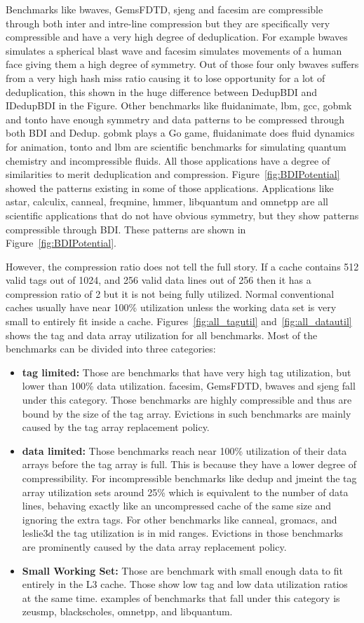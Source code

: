 Benchmarks like bwaves, GemsFDTD, sjeng and facesim are compressible through both inter and intre-line compression but they are specifically very compressible and have a very high degree of deduplication. For example bwaves simulates a spherical blast wave and facesim simulates movements of a human face giving them a high degree of symmetry. Out of those four only bwaves suffers from a very high hash miss ratio causing it to lose opportunity for a lot of deduplication, this shown in the huge difference between DedupBDI and IDedupBDI in the Figure. Other benchmarks like fluidanimate, lbm, gcc, gobmk and tonto have enough symmetry and data patterns to be compressed through both BDI and Dedup. gobmk plays a Go game, fluidanimate does fluid dynamics for animation, tonto and lbm are scientific benchmarks for simulating quantum chemistry and incompressible fluids. All those applications have a degree of similarities to merit deduplication and compression. Figure~\ref{fig:BDIPotential} showed the patterns existing in some of those applications. Applications like astar, calculix, canneal, freqmine, hmmer, libquantum and omnetpp are all scientific applications that do not have obvious symmetry, but they show patterns compressible through BDI. These patterns are shown in Figure~\ref{fig:BDIPotential}.\par
However, the compression ratio does not tell the full story. If a cache contains 512 valid tags out of 1024, and 256 valid data lines out of 256 then it has a compression ratio of 2 but it is not being fully utilized. Normal conventional caches usually have near 100\% utilization unless the working data set is very small to entirely fit inside a cache. Figures~\ref{fig:all_tagutil} and~\ref{fig:all_datautil} shows the tag and data array utilization for all benchmarks. Most of the benchmarks can be divided into three categories:
\begin{itemize}
    \item \textbf{tag limited:} Those are benchmarks that have very high tag utilization, but lower than 100\% data utilization. facesim, GemsFDTD, bwaves and sjeng fall under this category. Those benchmarks are highly compressible and thus are bound by the size of the tag array. Evictions in such benchmarks are mainly caused by the tag array replacement policy.
    \item \textbf{data limited:} Those benchmarks reach near 100\% utilization of their data arrays before the tag array is full. This is because they have a lower degree of compressibility. For incompressible benchmarks like dedup and jmeint the tag array utilization sets around 25\% which is equivalent to the number of data lines, behaving exactly like an uncompressed cache of the same size and ignoring the extra tags. For other benchmarks like canneal, gromacs, and leslie3d the tag utilization is in mid ranges. Evictions in those benchmarks are prominently caused by the data array replacement policy.
    \item \textbf{Small Working Set:} Those are benchmark with small enough data to fit entirely in the L3 cache. Those show low tag and low data utilization ratios at the same time. examples of benchmarks that fall under this category is zeusmp, blackscholes, omnetpp, and libquantum.
\end{itemize}
